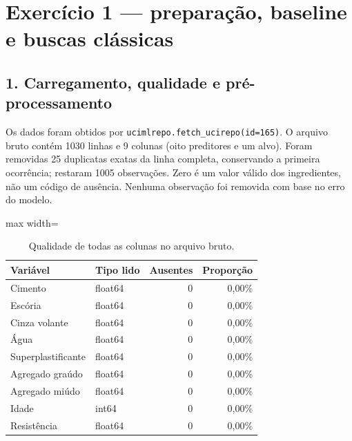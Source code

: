 \documentclass[12pt,a4paper]{article}
\begin{document}
\section{Exercício 1 — preparação, baseline e buscas clássicas}

\subsection{1. Carregamento, qualidade e pré-processamento}

Os dados foram obtidos por \texttt{ucimlrepo.fetch\_ucirepo(id=165)}. O arquivo bruto contém 1030 linhas e 9 colunas (oito preditores e um alvo). Foram removidas 25 duplicatas exatas da linha completa, conservando a primeira ocorrência; restaram 1005 observações. Zero é um valor válido dos ingredientes, não um código de ausência. Nenhuma observação foi removida com base no erro do modelo.

\begin{table}[H]
\centering
\caption{Qualidade de todas as colunas no arquivo bruto.}
\small
\setlength{\tabcolsep}{4.5pt}
\renewcommand{\arraystretch}{1.16}
\begin{adjustbox}{max width=\linewidth}
\begin{tabular}{@{}llrr@{}}
\toprule
Variável & Tipo lido & Ausentes & Proporção \\
\midrule
Cimento & float64 & 0 & 0{,}00\% \\
Escória & float64 & 0 & 0{,}00\% \\
Cinza volante & float64 & 0 & 0{,}00\% \\
Água & float64 & 0 & 0{,}00\% \\
Superplastificante & float64 & 0 & 0{,}00\% \\
Agregado graúdo & float64 & 0 & 0{,}00\% \\
Agregado miúdo & float64 & 0 & 0{,}00\% \\
Idade & int64 & 0 & 0{,}00\% \\
Resistência & float64 & 0 & 0{,}00\% \\
\bottomrule
\end{tabular}
\end{adjustbox}
\end{table}
\end{document}
